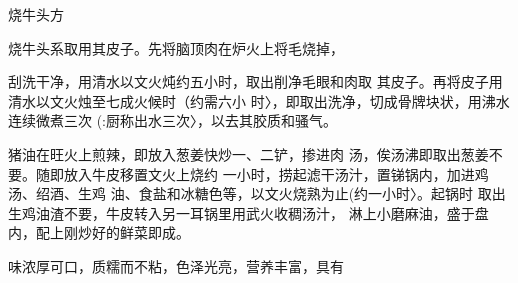 \begin{recipe}{烧牛头方}

\ingredients




\cooking

烧牛头系取用其皮子。先将脑顶肉在炉火上将毛烧掉，

刮洗干净，用清水以文火炖约五小时，取出削净毛眼和肉取 其皮子。再将皮子用清水以文火烛至七成火候时（约需六小 时〉，即取出洗净，切成骨牌块状，用沸水连续微煮三次 (:厨称出水三次〉，以去其胶质和骚气。

猪油在旺火上煎辣，即放入葱姜快炒一、二铲，掺进肉 汤，俟汤沸即取出葱姜不要。随即放入牛皮移置文火上烧约 一小时，捞起滤干汤汁，置锑锅内，加进鸡汤、绍酒、生鸡 油、食盐和冰糖色等，以文火烧熟为止(约一小时〉。起锅时 取出生鸡油渣不要，牛皮转入另一耳锅里用武火收稠汤汁， 淋上小磨麻油，盛于盘内，配上刚炒好的鲜菜即成。

\notes

味浓厚可口，质糯而不粘，色泽光亮，营养丰富，具有

\end{recipe}

